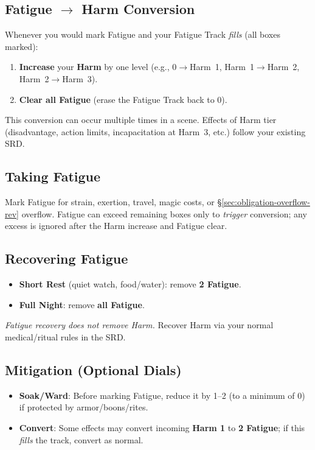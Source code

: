 \subsection*{Fatigue $\rightarrow$ Harm Conversion}
Whenever you would mark Fatigue and your Fatigue Track \emph{fills} (all boxes marked):
\begin{enumerate}
  \item \textbf{Increase} your \textbf{Harm} by one level (e.g., 0$\rightarrow$Harm~1, Harm~1$\rightarrow$Harm~2, Harm~2$\rightarrow$Harm~3).
  \item \textbf{Clear all Fatigue} (erase the Fatigue Track back to 0).
\end{enumerate}
This conversion can occur multiple times in a scene. Effects of Harm tier (disadvantage, action limits, incapacitation at Harm~3, etc.) follow your existing SRD.

\subsection*{Taking Fatigue}
Mark Fatigue for strain, exertion, travel, magic costs, or \S\ref{sec:obligation-overflow-rev} overflow. Fatigue can exceed remaining boxes only to \emph{trigger} conversion; any excess is ignored after the Harm increase and Fatigue clear.

\subsection*{Recovering Fatigue}
\begin{itemize}
  \item \textbf{Short Rest} (quiet watch, food/water): remove \textbf{2 Fatigue}.
  \item \textbf{Full Night}: remove \textbf{all Fatigue}.
\end{itemize}
\emph{Fatigue recovery does not remove Harm.} Recover Harm via your normal medical/ritual rules in the SRD.

\subsection*{Mitigation (Optional Dials)}
\begin{itemize}
  \item \textbf{Soak/Ward}: Before marking Fatigue, reduce it by 1--2 (to a minimum of 0) if protected by armor/boons/rites.
  \item \textbf{Convert}: Some effects may convert incoming \textbf{Harm 1} to \textbf{2 Fatigue}; if this \emph{fills} the track, convert as normal.
\end{itemize}

